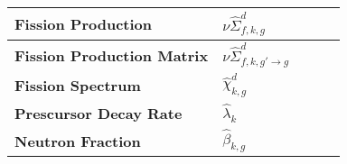 \begin{table}[h!]
\begin{tabular}{ m{1.5cm} m{1.2cm} m{2cm} m{2.5cm} l }
  \parbox{1.5cm}{\bf Fission \hspace{1cm} Production} & $\nu\hat{\Sigma}_{f,k,g}^{d}$ & & \\

  \midrule

  \parbox{1.5cm}{\bf Fission \hspace{1cm} Production Matrix} & $\nu\hat{\Sigma}_{f,k,g'\rightarrow g}^{d}$ & & \\

  \midrule

  \parbox{1.5cm}{\bf Fission \hspace{1cm} Spectrum} & $\hat{\chi}_{k,g}^{d}$ & & \\

  \midrule

  \parbox{1.5cm}{\bf Prescursor \hspace{1cm} Decay Rate} & $\hat{\lambda}_{k}$ & & \\

  \midrule

  \parbox{1.5cm}{\bf Neutron \hspace{1cm} Fraction} & $\hat{\beta}_{k,g}$ & & \\

  \midrule

\end{tabular}
\end{table}

